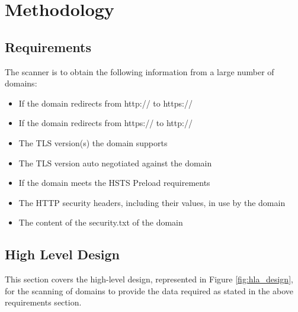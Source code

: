\documentclass{mscreport}
\begin{document}
\newpage

\section{Methodology}

\subsection{Requirements}

The scanner is to obtain the following information from a large number of domains:

\begin{itemize}
	\setlength\itemsep{0.1em}
    \item If the domain redirects from http:// to https://
    \item If the domain redirects from https:// to http://
    \item The TLS version(s) the domain supports
    \item The TLS version auto negotiated against the domain
    \item If the domain meets the HSTS Preload requirements
    \item The HTTP security headers, including their values, in use by the domain
    \item The content of the security.txt of the domain
\end{itemize}

\subsection{High Level Design}
\label{subsection:hld}

This section covers the high-level design, represented in Figure \ref{fig:hla_design}, for the scanning of domains to provide the data required as stated in the above requirements section. 

\end{document}
